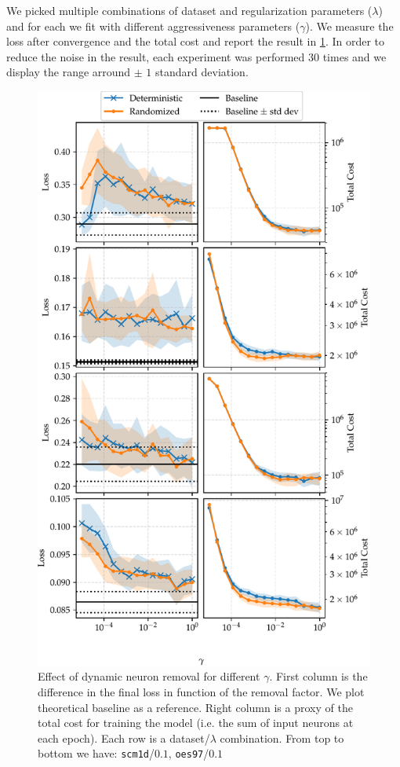 We picked multiple combinations of dataset and regularization parameters ($\lambda$) and for each we fit with different aggressiveness parameters ($\gamma$). We measure the loss after convergence and the total cost and report the result in \cref{neuron_removal_figure}. In order to reduce the noise in the result, each experiment was performed $30$ times and we display the range arround $\pm$ $1$ standard deviation.

\begin{figure}
\begin{center}
\includegraphics[width=\columnwidth]{neuron_removal}
\vspace*{-5mm}
\caption{\label{neuron_removal_figure}Effect of dynamic neuron removal for different $\gamma$. First column is the difference in the final loss in function of the removal factor. We plot theoretical baseline as a reference. Right column is a proxy of the total cost for training the model (i.e. the sum of input neurons at each epoch). Each row is a dataset/$\lambda$ combination. From top to bottom we have: \texttt{scm1d}/$0.1$, \texttt{oes97}/$0.1$}


\end{center}
\end{figure}
